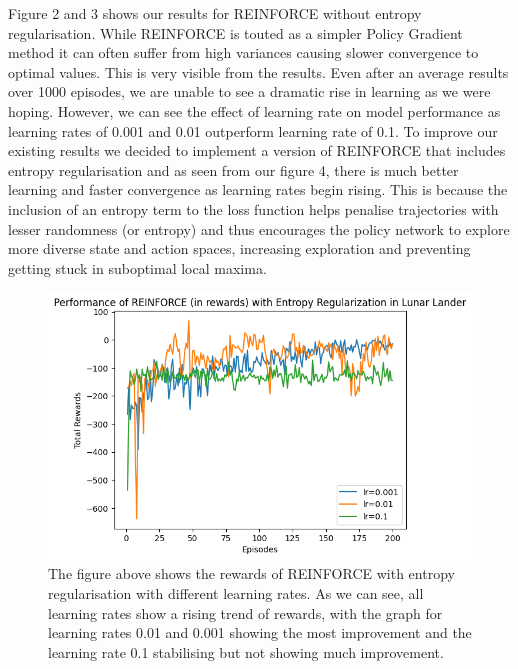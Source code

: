 \documentclass{article}
\begin{document}
Figure 2 and 3 shows our results for REINFORCE without entropy regularisation. While REINFORCE is touted as a simpler Policy Gradient method it can often suffer from high variances causing slower convergence to optimal values. This is very visible from the results. Even after an average results over 1000 episodes, we are unable to see a dramatic rise in learning as we were hoping. However, we can see the effect of learning rate on model performance as learning rates of 0.001 and 0.01 outperform learning rate of 0.1. To improve our existing results we decided to implement a version of REINFORCE that includes entropy regularisation and as seen from our figure 4, there is much better learning and faster convergence as learning rates begin rising. This is because the inclusion of an entropy term to the loss function helps penalise trajectories with lesser randomness (or entropy) and thus encourages the policy network to explore more diverse state and action spaces, increasing exploration and preventing getting stuck in suboptimal local maxima. 

\begin{figure}[htbp]
\centering
\includegraphics[width=0.9\linewidth]{Report/images/entropy_regularisation.png}
\caption{\label{fig:ReinforceEntropy Rewards}The figure above shows the rewards of REINFORCE with entropy regularisation with different learning rates. As we can see, all learning rates show a rising trend of rewards, with the graph for learning rates 0.01 and 0.001 showing the most improvement and the learning rate 0.1 stabilising but not showing much improvement. }
\end{figure}
\end{document}
